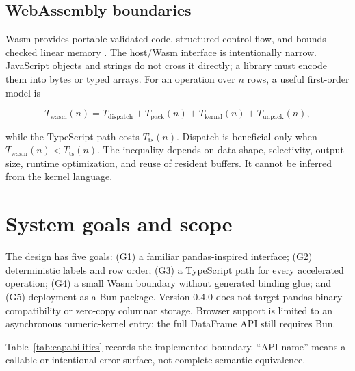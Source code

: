 \documentclass[pdflatex,sn-basic,Numbered]{sn-jnl}
\begin{document}
\subsection{WebAssembly boundaries}

Wasm provides portable validated code, structured control flow, and bounds-checked linear memory \cite{wasmcore2}. The host/Wasm interface is intentionally narrow. JavaScript objects and strings do not cross it directly; a library must encode them into bytes or typed arrays. For an operation over $n$ rows, a useful first-order model is

\begin{equation}
T_{\mathrm{wasm}}(n)=T_{\mathrm{dispatch}}+T_{\mathrm{pack}}(n)+T_{\mathrm{kernel}}(n)+T_{\mathrm{unpack}}(n),
\label{eq:cost}
\end{equation}

while the TypeScript path costs $T_{\mathrm{ts}}(n)$. Dispatch is beneficial only when $T_{\mathrm{wasm}}(n)<T_{\mathrm{ts}}(n)$. The inequality depends on data shape, selectivity, output size, runtime optimization, and reuse of resident buffers. It cannot be inferred from the kernel language.

\section{System goals and scope}\label{sec:goals}

The design has five goals: (G1) a familiar pandas-inspired interface; (G2) deterministic labels and row order; (G3) a TypeScript path for every accelerated operation; (G4) a small Wasm boundary without generated binding glue; and (G5) deployment as a Bun package. Version 0.4.0 does not target pandas binary compatibility or zero-copy columnar storage. Browser support is limited to an asynchronous numeric-kernel entry; the full DataFrame API still requires Bun.

Table~\ref{tab:capabilities} records the implemented boundary. ``API name'' means a callable or intentional error surface, not complete semantic equivalence.
\end{document}

